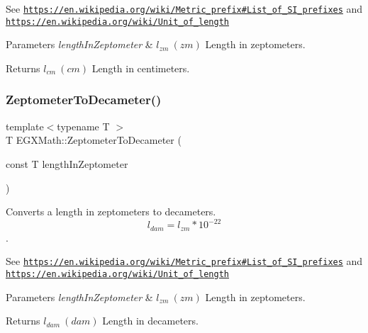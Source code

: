 See \href{https://en.wikipedia.org/wiki/Metric_prefix#List_of_SI_prefixes}{\tt https\+://en.\+wikipedia.\+org/wiki/\+Metric\+\_\+prefix\#\+List\+\_\+of\+\_\+\+S\+I\+\_\+prefixes} and \href{https://en.wikipedia.org/wiki/Unit_of_length}{\tt https\+://en.\+wikipedia.\+org/wiki/\+Unit\+\_\+of\+\_\+length} 
\begin{DoxyParams}{Parameters}
{\em length\+In\+Zeptometer} & $ l_{zm}\ (zm)$ Length in zeptometers. \\
\hline
\end{DoxyParams}
\begin{DoxyReturn}{Returns}
$ l_{cm}\ (cm)$ Length in centimeters. 
\end{DoxyReturn}
\mbox{\label{group___e_g_x_math-_conversions-_length_conversions-_zeptometer-_s_i_ga4076e322cf0f16f1eb977409e4f8f251}} 
\subsubsection{\texorpdfstring{Zeptometer\+To\+Decameter()}{ZeptometerToDecameter()}}
{\footnotesize\ttfamily template$<$typename T $>$ \\
T E\+G\+X\+Math\+::\+Zeptometer\+To\+Decameter (\begin{DoxyParamCaption}\item[{const T}]{length\+In\+Zeptometer }\end{DoxyParamCaption})}



Converts a length in zeptometers to decameters. \[ l_{dam}=l_{zm} * 10^{-22} \]. 

See \href{https://en.wikipedia.org/wiki/Metric_prefix#List_of_SI_prefixes}{\tt https\+://en.\+wikipedia.\+org/wiki/\+Metric\+\_\+prefix\#\+List\+\_\+of\+\_\+\+S\+I\+\_\+prefixes} and \href{https://en.wikipedia.org/wiki/Unit_of_length}{\tt https\+://en.\+wikipedia.\+org/wiki/\+Unit\+\_\+of\+\_\+length} 
\begin{DoxyParams}{Parameters}
{\em length\+In\+Zeptometer} & $ l_{zm}\ (zm)$ Length in zeptometers. \\
\hline
\end{DoxyParams}
\begin{DoxyReturn}{Returns}
$ l_{dam}\ (dam)$ Length in decameters. 
\end{DoxyReturn}
\mbox{\label{group___e_g_x_math-_conversions-_length_conversions-_zeptometer-_s_i_ga9a25b6696c3f6ed8df86a77e1da46830}} 
